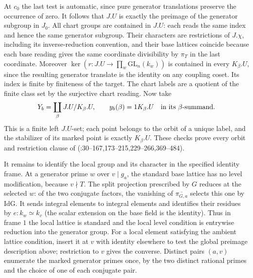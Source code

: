 At $c_0$ the last test is automatic, since pure generator translations
preserve the occurrence of zero. It follows that $J.U$ is exactly the
preimage of the generator subgroup in $J_0$. All chart groups are
contained in $J.U$: each reads the same index and hence the same
generator subgroup. Their characters are restrictions of $J.\chi$,
including its inverse-reduction convention, and their base lattices
coincide because each base reading gives the same coordinate
divisibility by $\pi_T$ in the last coordinate.
Moreover $\ker(r:J.U\to\prod_w\mathrm{GL}_n(k_w))$ is contained
in every $K_\beta.U$, since the resulting generator translate is
the identity on any coupling coset. Its index is finite by finiteness
of the target. The chart labels are a quotient of the finite class
set by the surjective chart reading. Now take
\[
 Y_b=\coprod_\beta J.U/K_\beta.U,\qquad y_b(\beta)=1K_\beta.U
 \quad\hbox{in its $\beta$-summand}.
\]
This is a finite left $J.U$-set; each point belongs to the orbit of
a unique label, and the stabilizer of its marked point is exactly
$K_\beta.U$. These checks prove every orbit and restriction clause of
(:30--167,173--215,229--266,369--484).

It remains to identify the local group and its character in the
specified identity frame. At a generator prime $w$ over $v\mid g_a$,
the standard base lattice has no level modification, because
$v\nmid T$. The split projection prescribed by $G$ reduces at the
selected $w$: of the two conjugate factors, the vanishing of
$\overline{\pi_{G,a}}$ selects this one by $\mathrm{IdG}$. It sends
integral elements to integral elements and identifies their residues
by $e:k_w\simeq k_v$ (the scalar extension on the base field is the
identity). Thus in frame $1$ the local lattice is standard and the
local level condition is entrywise reduction into the generator group.
For a local element satisfying the ambient lattice condition, insert
it at $v$ with identity elsewhere to test the global preimage
description above; restriction to $v$ gives the converse. Distinct
pairs $(a,v)$ enumerate the marked generator primes once, by the two
distinct rational primes and the choice of one of each conjugate pair.

